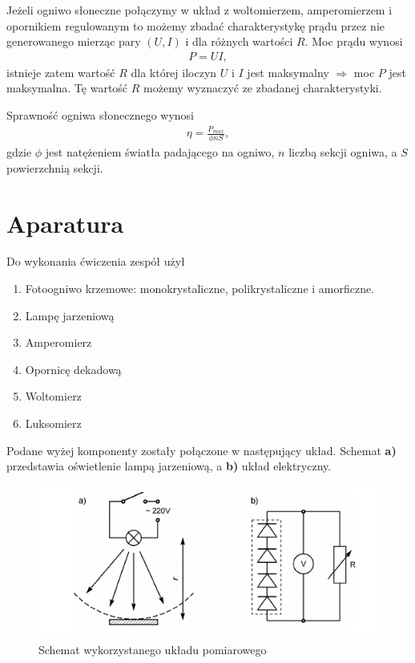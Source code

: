 \documentclass{article}
\begin{document}
Jeżeli ogniwo słoneczne połączymy w układ z woltomierzem,
amperomierzem i opornikiem regulowanym to możemy zbadać charakterystykę
prądu przez nie generowanego mierząc pary $(U, I)$ i dla różnych
wartości $R$. Moc prądu wynosi
\begin{align}
    P = UI,
\end{align}
istnieje zatem wartość $R$ dla której iloczyn $U$ i $I$ jest maksymalny
$\Rightarrow$ moc $P$ jest maksymalna. Tę wartość $R$ możemy wyznaczyć ze zbadanej
charakterystyki.

Sprawność ogniwa słonecznego wynosi
\begin{align}
    \eta = \frac{P_{max}}{\phi nS},
    \label{eq:sprawnosc}
\end{align}
gdzie $\phi$ jest natężeniem światła padającego na ogniwo, $n$ liczbą sekcji ogniwa, a $S$
powierzchnią sekcji.
\section{Aparatura}
Do wykonania ćwiczenia zespół użył 
\begin{enumerate}
    \item Fotoogniwo krzemowe: monokrystaliczne, polikrystaliczne i amorficzne. 
    \item Lampę jarzeniową
    \item Amperomierz
    \item Opornicę dekadową
    \item Woltomierz
    \item Luksomierz
\end{enumerate}
Podane wyżej komponenty zostały połączone w następujący układ. Schemat \textbf{a)} przedstawia oświetlenie lampą jarzeniową, a \textbf{b)} układ elektryczny.
\begin{figure}[H]
    \centering
    \includegraphics[scale=1]{cw134/schemat_cw134.png}
    \caption{Schemat wykorzystanego układu pomiarowego}
\end{figure}
\end{document}
